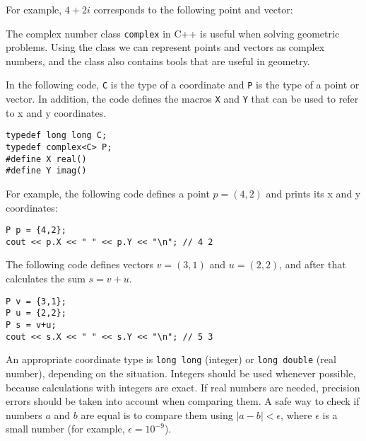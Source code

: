 For example, $4+2i$ corresponds to the
following point and vector:

\begin{center}
\end{center}


The complex number class \texttt{complex} in C++ is
useful when solving geometric problems.
Using the class we can represent points and vectors
as complex numbers, and the class also contains tools
that are useful in geometry.

In the following code, \texttt{C} is the type of
a coordinate and \texttt{P} is the type of a point or vector.
In addition, the code defines the macros \texttt{X} and \texttt{Y}
that can be used to refer to x and y coordinates.

\begin{lstlisting}
typedef long long C;
typedef complex<C> P;
#define X real()
#define Y imag()
\end{lstlisting}

For example, the following code defines a point $p=(4,2)$
and prints its x and y coordinates:

\begin{lstlisting}
P p = {4,2};
cout << p.X << " " << p.Y << "\n"; // 4 2
\end{lstlisting}

The following code defines vectors $v=(3,1)$ and $u=(2,2)$,
and after that calculates the sum $s=v+u$.

\begin{lstlisting}
P v = {3,1};
P u = {2,2};
P s = v+u;
cout << s.X << " " << s.Y << "\n"; // 5 3
\end{lstlisting}

An appropriate coordinate type is
\texttt{long long} (integer) or \texttt{long double}
(real number), depending on the situation.
Integers should be used whenever possible,
because calculations with integers are exact.
If real numbers are needed,
precision errors should be taken into account
when comparing them.
A safe way to check if numbers $a$ and $b$ are equal
is to compare them using $|a-b|<\epsilon$,
where $\epsilon$ is a small number (for example, $\epsilon=10^{-9}$).


